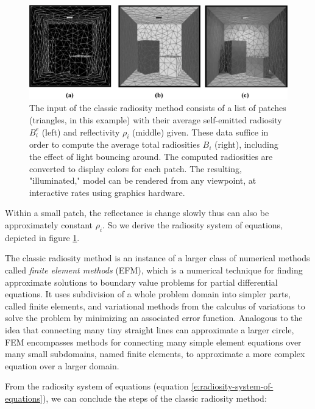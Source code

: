 \begin{figure}\label{f:radiosity-system-of-equations}
	\includegraphics[width=1.0\textwidth]{graphics/gi/path-19}
	\caption{The input of the classic radiosity method consists of a list of patches (triangles, in this example) with their average self-emitted radiosity $B_{i}^{e}$ (left) and reflectivity $\rho_i$ (middle) given. These data suffice in order to compute the average total radiosities $B_i$ (right), including the effect of light bouncing around. The computed radiosities are converted to display colors for each patch. The resulting, "illuminated," model can be rendered from any viewpoint, at interactive rates using graphics hardware.}
\end{figure}

Within a small patch, the reflectance is change slowly thus can also be approximately constant $\rho_i$. So we derive the radiosity system of equations, depicted in figure \ref{f:radiosity-system-of-equations}.

The classic radiosity method is an instance of a larger class of numerical methods called \textit{finite element methods} (EFM), which is a numerical technique for finding approximate solutions to boundary value problems for partial differential equations. It uses subdivision of a whole problem domain into simpler parts, called finite elements, and variational methods from the calculus of variations to solve the problem by minimizing an associated error function. Analogous to the idea that connecting many tiny straight lines can approximate a larger circle, FEM encompasses methods for connecting many simple element equations over many small subdomains, named finite elements, to approximate a more complex equation over a larger domain.   

From the radiosity system of equations (equation \ref{e:radiosity-system-of-equations}), we can conclude the steps of the classic radiosity method:

